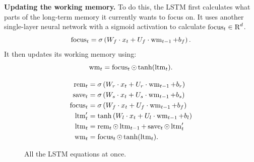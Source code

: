 \medskip
\noindent \textbf{Updating the working memory.} To do this, the LSTM first
calculates what parts of the long-term memory it currently wants to focus on.
It uses another single-layer neural network with a sigmoid activation to
calculate $\operatorname{focus}_{t} \in \text{R}^{d}$.
\begin{equation}
\operatorname{focus}_{t} = \sigma \left ( W_f \cdot x_t + U_f \cdot \operatorname{wm}_{t - 1} + b_f \right ).
\end{equation}
It then updates its working memory using:
\begin{equation}
\operatorname{wm}_{t} = \operatorname{focus}_{t} \odot \tanh(\operatorname{ltm}_{t}).
\end{equation}


\begin{figure}[ht]
\begin{tcolorbox}
\begin{align*}
    \operatorname{rem}_{t}   & = \sigma \left ( W_r \cdot x_t + U_r \cdot \operatorname{wm}_{t - 1} + b_r \right ) \\
    \operatorname{save}_{t}  & = \sigma \left ( W_s \cdot x_t + U_s \cdot \operatorname{wm}_{t - 1} + b_s \right ) \\
    \operatorname{focus}_{t} & = \sigma \left ( W_f \cdot x_t + U_f \cdot \operatorname{wm}_{t - 1} + b_f \right ) \\
    \operatorname{ltm}_{t}'  & = \tanh \left ( W_l \cdot x_t + U_l \cdot \operatorname{wm}_{t - 1} + b_l \right ) \\
    \operatorname{ltm}_{t}   & = \operatorname{rem}_{t} \odot \operatorname{ltm}_{t - 1} + \operatorname{save}_{t} \odot \operatorname{ltm}_{t}' \\
    \operatorname{wm}_{t}    & = \operatorname{focus}_{t} \odot \tanh(\operatorname{ltm}_{t}).
\end{align*}
\end{tcolorbox}
\caption{All the LSTM equations at once.}
\end{figure}





